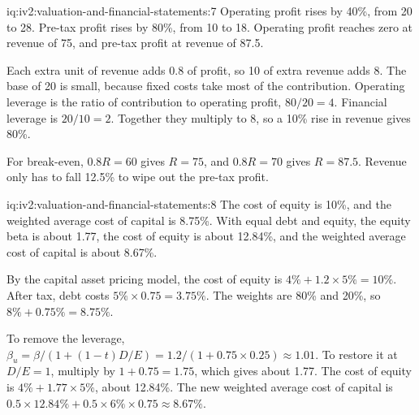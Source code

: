 \begin{solution}{iq:iv2:valuation-and-financial-statements:7}
Operating profit rises by 40\%, from 20 to 28. Pre-tax profit rises by 80\%, from 10 to 18. Operating profit reaches zero at revenue of 75, and pre-tax profit at revenue of 87.5.

Each extra unit of revenue adds 0.8 of profit, so 10 of extra revenue adds 8. The base of 20 is small, because fixed costs take most of the contribution. Operating leverage is the ratio of contribution to operating profit, $80/20 = 4$. Financial leverage is $20/10 = 2$. Together they multiply to 8, so a 10\% rise in revenue gives 80\%.

For break-even, $0.8R = 60$ gives $R = 75$, and $0.8R = 70$ gives $R = 87.5$. Revenue only has to fall 12.5\% to wipe out the pre-tax profit.

\end{solution}

\begin{solution}{iq:iv2:valuation-and-financial-statements:8}
The cost of equity is 10\%, and the weighted average cost of capital is 8.75\%. With equal debt and equity, the equity beta is about 1.77, the cost of equity is about 12.84\%, and the weighted average cost of capital is about 8.67\%.

By the capital asset pricing model, the cost of equity is $4\% + 1.2 \times 5\% = 10\%$. After tax, debt costs $5\% \times 0.75 = 3.75\%$. The weights are 80\% and 20\%, so $8\% + 0.75\% = 8.75\%$.

To remove the leverage, $\beta_u = \beta / \left(1 + (1 - t)D/E\right) = 1.2/(1 + 0.75 \times 0.25) \approx 1.01$. To restore it at $D/E = 1$, multiply by $1 + 0.75 = 1.75$, which gives about 1.77. The cost of equity is $4\% + 1.77 \times 5\%$, about 12.84\%. The new weighted average cost of capital is $0.5 \times 12.84\% + 0.5 \times 6\% \times 0.75 \approx 8.67\%$.

\end{solution}

